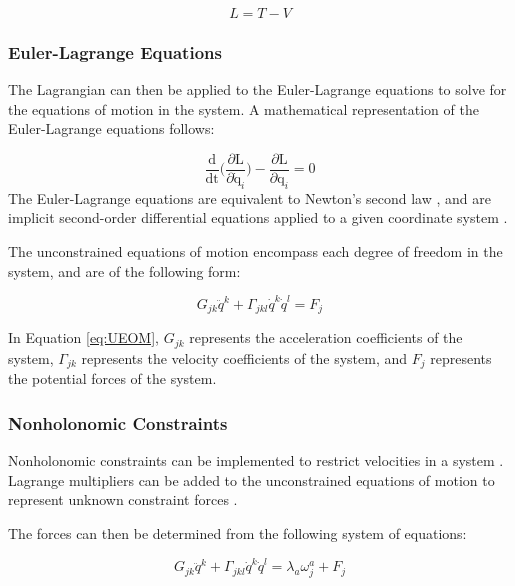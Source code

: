 \begin{equation}
\label{eq:Lagrange}
L = T - V
\end{equation}

\subsubsection{Euler-Lagrange Equations}

The Lagrangian can then be applied to the Euler-Lagrange equations to solve for the equations of motion in the system. 
A mathematical representation of the Euler-Lagrange equations follows:

\begin{equation}
\label{eq:EL}
\frac{\text{d}}{\text{dt}} \bigg(\frac{\partial \text{L}}{\partial \dot{\text{q}}_{i}}\bigg) - \frac{\partial \text{L}}{\partial \text{q}_{i}} = 0
\end{equation}
The Euler-Lagrange equations are equivalent to Newton's second law \cite{NonholonomicPowerpoint}, and are implicit second-order differential equations applied to a given coordinate system \cite{Lewis}.
\par
The unconstrained equations of motion encompass each degree of freedom in the system, and are of the following form:

\begin{equation}
\label{eq:UEOM}
G_{jk} \ddot{q}^k + \Gamma_{jkl} \dot{q}^k\dot{q}^l  = F_{j}
\end{equation}

In Equation \ref{eq:UEOM}, $G_{jk}$ represents the acceleration coefficients of the system, $\Gamma_{jk}$ represents the velocity coefficients of the system, and $F_j$ represents the potential forces of the system.

\subsubsection{Nonholonomic Constraints}

Nonholonomic constraints can be implemented to restrict velocities in a system \cite{LagrangeEquations}.
Lagrange multipliers can be added to the unconstrained equations of motion to represent unknown constraint forces \cite{ClassicalMechanics}.
\par
The forces can then be determined from the following system of equations:

\begin{equation}
\label{eq:CFE}
G_{jk} \ddot{q}^k + \Gamma_{jkl} \dot{q}^k\dot{q}^l  = \lambda_{a}\omega_{j}^{a} + F_{j}
\end{equation}

